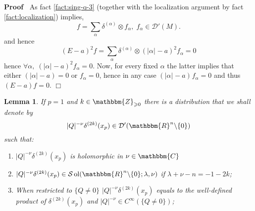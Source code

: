 \documentclass{article}
\newcommand{\tmop}[1]{\ensuremath{\operatorname{#1}}}
\newenvironment{proof}{\noindent\textbf{Proof\ }}{\hspace*{\fill}$\Box$\medskip}
\numberwithin{definition}{section}
\newtheorem{lemma}{Lemma}
\numberwithin{lemma}{section}
\numberwithin{proposition}{section}
{\theorembodyfont{\rmfamily}\newtheorem{remark}{Remark}
\numberwithin{remark}{section}
}
\begin{document}
\begin{proof}
  As fact \ref{fact:sing-q-3} (together with the localization argument by fact
  \ref{fact:localization}) implies,
  \[ f = \sum_{\alpha} \delta^{( \alpha)} \otimes f_{\alpha}, \; f_{\alpha}
     \in \mathcal{D}' ( M) . \]
  and hence
  \[ ( E - a)^2 f = \sum_{\alpha} \delta^{( \alpha)} \otimes ( | \alpha |^{} -
     a)^2 f_{\alpha} = 0 \]
  hence $\forall \alpha, \; ( | \alpha |^{} - a)^2 f_{\alpha} = 0$. Now, for
  every fixed $\alpha$ the latter implies that either $( | \alpha | - a) = 0$
  or $f_{\alpha} = 0$, hence in any case $( | \alpha |^{} - a)^{} f_{\alpha} =
  0$ and thus $( E - a) f = 0$.
\end{proof}

\begin{lemma}
  \label{sol-MO:lem-strangeelement}If $p = 1$ and $k \in
  \mathbbm{Z}_{\geqslant 0}$ there is a distribution that we shall denote by
  \[ | Q |^{- \nu} \delta^{( 2 k)} ( x_p) \in \mathcal{D}' ( \mathbbm{R}^n
     \backslash \{ 0 \}) \]
  such that:
  \begin{enumerate}
    \item $| Q |^{- \nu} \delta^{( 2 k)} ( x_p)$ is holomorphic in $\nu \in
    \mathbbm{C}$
    
    \item $| Q |^{- \nu} \delta^{( 2 k)} ( x_p) \in \mathcal{S} \tmop{ol} (
    \mathbbm{R}^n \backslash \{ 0 \} ; \lambda, \nu)$ if $\lambda + \nu - n =
    - 1 - 2 k$;
    
    \item When restricted to $\{ Q \neq 0 \}$ $| Q |^{- \nu} \delta^{( 2 k)} (
    x_p)$ equals to the well-defined product of $\delta^{( 2 k)} ( x_p)$ and
    $| Q |^{- \nu} \in C^{\infty} ( \{ Q \neq 0 \})$;
  \end{enumerate}
\end{lemma}
\end{document}
